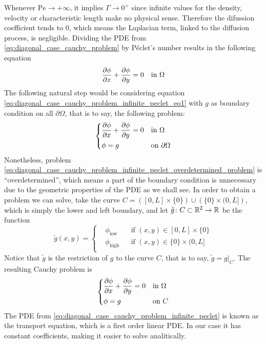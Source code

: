 Whenever $\mathrm{Pe} \to +\infty$, it implies $\Gamma \to 0^+$ since infinite
values for the density, velocity or characteristic length make no physical
sense. Therefore the difussion coefficient tends to $0$, which means the
Laplacian term, linked to the diffusion process, is negligible. Dividing the PDE
from \eqref{eq:diagonal_case_cauchy_problem} by Péclet's number results in the
following equation
\begin{equation} \label{eq:diagonal_case_cauchy_problem_infinite_peclet_eq1}
	\pdv{\phi}{x} + \pdv{\phi}{y} = 0 \quad \text{in } \Omega
\end{equation}
The following natural step would be considering equation
\eqref{eq:diagonal_case_cauchy_problem_infinite_peclet_eq1} with $g$ as boundary
condition on all $\partial \Omega$, that is to say, the following problem:
\begin{equation} \label{eq:diagonal_case_cauchy_problem_infinite_peclet_overdetermined_problem}
	\left\{
	\begin{aligned}
		&\pdv{\phi}{x} + \pdv{\phi}{y} = 0 &
		&\text{in } \Omega \\
		&\phi = g &
		&\text{on } \partial \Omega
	\end{aligned}
	\right.
\end{equation}
Nonetheless, problem
\eqref{eq:diagonal_case_cauchy_problem_infinite_peclet_overdetermined_problem}
is ``overdetermined'', which means a part of the boundary condition is
unnecessary due to the geometric properties of the PDE as we shall see. In order
to obtain a problem we can solve, take the curve $C = \left( [0,L] \times \{ 0
\} \right) \cup \left( \{ 0 \} \times (0,L] \right)$, which is simply the lower
and left boundary, and let $\tilde{g} \colon C \subset \mathbb{R}^2 \rightarrow
\mathbb{R}$ be the function
\begin{equation}
	\tilde{g}(x,y) = 
	\left\{
	\begin{aligned}
		&\phi_\text{low} 	& &\text{if } (x,y) \in [0,L] \times \{ 0 \} \\
		&\phi_\text{high} 	& &\text{if } (x,y) \in \{ 0 \} \times (0,L] \\
	\end{aligned}
	\right.
\end{equation}
Notice that $\tilde{g}$ is the restriction of $g$ to the curve $C$, that is to
say, $\tilde{g} = g \rvert_C$. The resulting Cauchy problem is
\begin{equation} \label{eq:diagonal_case_cauchy_problem_infinite_peclet}
	\left\{
	\begin{aligned}
		&\pdv{\phi}{x} + \pdv{\phi}{y} = 0 &
		&\text{in } \Omega \\
		&\phi = g &
		&\text{on } C
	\end{aligned}
	\right.
\end{equation}
The PDE from \eqref{eq:diagonal_case_cauchy_problem_infinite_peclet} is known as the
transport equation, which is a first order linear PDE. In our case it has
constant coefficients, making it easier to solve analitically.

